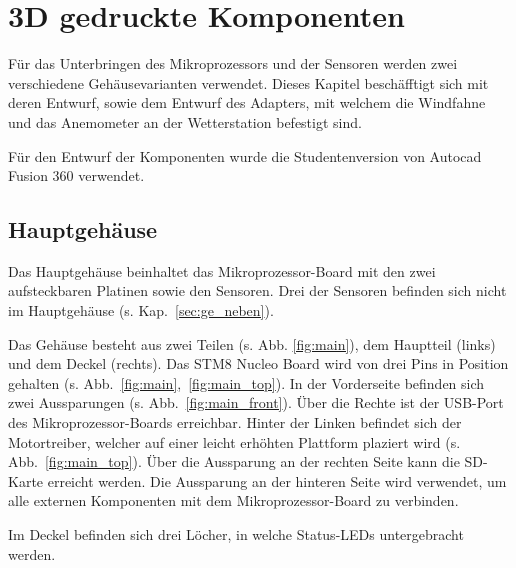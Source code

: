 \pagebreak
\section{3D gedruckte Komponenten}\label{sec:gehaeuse}
Für das Unterbringen des Mikroprozessors und der Sensoren werden zwei verschiedene Gehäusevarianten verwendet. Dieses Kapitel beschäfftigt sich mit deren Entwurf, sowie dem Entwurf des Adapters, mit welchem die Windfahne und das Anemometer an der Wetterstation befestigt sind.

Für den Entwurf der Komponenten wurde die Studentenversion von Autocad Fusion 360 verwendet.

\subsection{Hauptgehäuse}\label{sec:ge_haupt}
Das Hauptgehäuse beinhaltet das Mikroprozessor-Board mit den zwei aufsteckbaren Platinen sowie den Sensoren. Drei der Sensoren befinden sich nicht im Hauptgehäuse (s. Kap.~\ref{sec:ge_neben}).

Das Gehäuse besteht aus zwei Teilen (s. Abb. \ref{fig:main}), dem Hauptteil (links) und dem Deckel (rechts). Das STM8 Nucleo Board wird von drei Pins in Position gehalten (s. Abb.~\ref{fig:main},~\ref{fig:main_top}). In der Vorderseite befinden sich zwei Aussparungen (s. Abb.~\ref{fig:main_front}). Über die Rechte ist der USB-Port des Mikroprozessor-Boards erreichbar. Hinter der Linken befindet sich der Motortreiber, welcher auf einer leicht erhöhten Plattform plaziert wird (s. Abb.~\ref{fig:main_top}). Über die Aussparung an der rechten Seite kann die SD-Karte erreicht werden. Die Aussparung an der hinteren Seite wird verwendet, um alle externen Komponenten mit dem Mikroprozessor-Board zu verbinden.

Im Deckel befinden sich drei Löcher, in welche Status-LEDs untergebracht werden.

